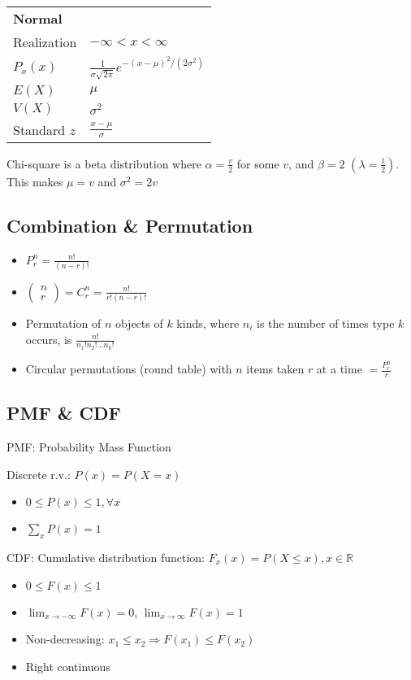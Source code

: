 \documentclass[12pt]{article}
\newcommand\mm[1]{\begin{pmatrix}#1\end{pmatrix}}
\newcommand{\real}[0]{\mathbb{R}}
\begin{document}
\newpage
\begin{tabularx}{\textwidth}{X | X}
	\textbf{Normal} \\
	Realization & $-\infty < x < \infty$ \\
	$P_x(x)$ & $\frac{1}{\sigma \sqrt{2\pi}} e^{-(x - \mu)^2 / (2 \sigma^2)}$ \\
	$E(X)$ & $\mu$ \\
	$V(X)$ & $\sigma^2$ \\
	Standard $z$ & $\frac{x - \mu}{\sigma}$
\end{tabularx}

\newpage
Chi-square is a beta distribution where $\alpha = \frac{v}{2}$ for some $v$, and $\beta = 2$ $(\lambda = \frac{1}{2})$. This makes $\mu = v$ and $\sigma^2 = 2v$

\subsection{Combination \& Permutation}

\begin{itemize}
	\item $P_r^n = \frac{n!}{(n - r)!}$
	\item $\mm{n \\ r} = C_r^n = \frac{n!}{r! (n - r)!}$
	\item Permutation of $n$ objects of $k$ kinds, where $n_i$ is the number of times type $k$ occurs, is $\frac{n!}{n_1! n_2! ... n_k!}$
	\item Circular permutations (round table) with $n$ items taken $r$ at a time $ = \frac{P_r^n}{r}$
\end{itemize}

\subsection{PMF \& CDF}

PMF: Probability Mass Function

Discrete r.v.: $P(x) = P(X = x)$

\begin{itemize}
	\item $0 \le P(x) \le 1, \forall x$
	\item $\sum_x P(x) = 1$
\end{itemize}

CDF: Cumulative distribution function: $F_x(x) = P(X \le x), x \in \real$

\begin{itemize}
	\item $0 \le F(x) \le 1$
	\item $\lim_{x \rightarrow -\infty} F(x) = 0$, $\lim_{x \rightarrow \infty} F(x) = 1$
	\item Non-decreasing: $x_1 \le x_2 \Rightarrow F(x_1) \le F(x_2)$
	\item Right continuous
\end{itemize}
\end{document}
